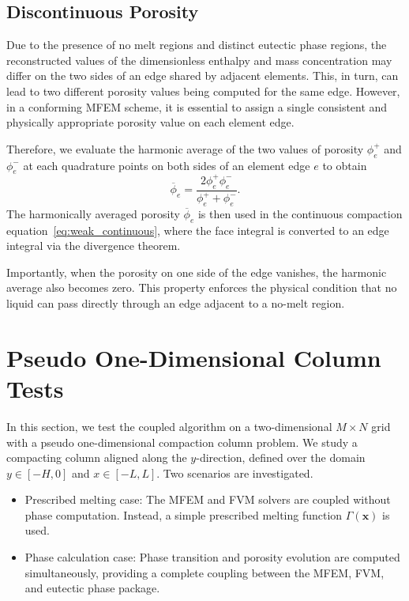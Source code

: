 \subsection{Discontinuous Porosity}
\label{sec:disporo}
Due to the presence of no melt regions and distinct eutectic phase regions, 
the reconstructed values of the dimensionless enthalpy and mass concentration may 
differ on the two sides of an edge shared by adjacent elements.
This, in turn, can lead to two different porosity values being computed for the same edge.
However, in a conforming MFEM scheme, it is essential to assign a single consistent 
and physically appropriate porosity value on each element edge.

Therefore, we evaluate the harmonic average of the two values of porosity 
$\phi_e^+$ and $\phi_e^-$ at each quadrature points on both sides 
of an element edge $e$ to obtain
\begin{equation}
		  \overline{\phi}_e = \frac{2\phi_e^{+}\phi_e^{-}}{\phi_e^{+} + \phi_e^{-}}.
\end{equation}
The harmonically averaged porosity $\overline{\phi}_e$ is then used in
the continuous compaction equation~\eqref{eq:weak_continuous}, 
where the face integral is converted to an edge integral via the divergence theorem.

Importantly, when the porosity on one side of the edge vanishes, 
the harmonic average also becomes zero. This property enforces the physical condition 
that no liquid can pass directly through an edge adjacent to a no-melt region.

\section{Pseudo One-Dimensional Column Tests}
\label{sec:pseudo1d}
In this section, we test the coupled algorithm on a two-dimensional $M\times N$ grid with a pseudo one-dimensional 
compaction column problem.
We study a compacting column aligned along the $y$-direction, defined over the domain $y\in[-H,0]$ and
$x\in [-L,L]$.
Two scenarios are investigated.
\begin{itemize}
\item Prescribed melting case: The MFEM and FVM solvers are coupled without phase computation.
Instead, a simple 
prescribed melting function $\Gamma(\mathbf{x})$ is used.
\item Phase calculation case: Phase transition and porosity evolution are computed simultaneously, 
providing a complete coupling between the MFEM, FVM, and eutectic phase package. 
\end{itemize}

